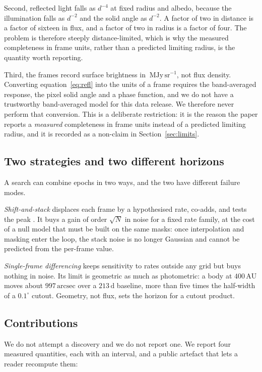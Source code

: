 \documentclass[11pt,a4paper]{article}
\newcommand{\unit}[1]{\,\mathrm{#1}}
\newcommand{\mjysr}{\ \mathrm{MJy\,sr^{-1}}}
\newcommand{\arcsec}{\unit{arcsec}}
\newcommand{\au}{\unit{AU}}
\begin{document}
Second, reflected light falls as $d^{-4}$ at fixed radius and albedo, because the
illumination falls as $d^{-2}$ and the solid angle as $d^{-2}$. A factor of two in
distance is a factor of sixteen in flux, and a factor of two in radius is a factor
of four. The problem is therefore steeply distance-limited, which is why the
measured completeness in frame units, rather than a predicted limiting radius, is
the quantity worth reporting.

Third, the frames record surface brightness in $\mjysr$, not flux density.
Converting equation~\eqref{eq:refl} into the units of a frame requires the
band-averaged response, the pixel solid angle and a phase function, and we do not
have a trustworthy band-averaged model for this data release. We therefore never
perform that conversion. This is a deliberate restriction: it is the reason the
paper reports a \emph{measured} completeness in frame units instead of a predicted
limiting radius, and it is recorded as a non-claim in Section~\ref{sec:limits}.

\subsection{Two strategies and two different horizons}
A search can combine epochs in two ways, and the two have different failure modes.

\emph{Shift-and-stack} displaces each frame by a hypothesised rate, co-adds, and
tests the peak \citep{rice2020}. It buys a gain of order $\sqrt{N}$ in noise for a
fixed rate family, at the cost of a null model that must be built on the same
masks: once interpolation and masking enter the loop, the stack noise is no longer
Gaussian and cannot be predicted from the per-frame value.

\emph{Single-frame differencing} keeps sensitivity to rates outside any grid but
buys nothing in noise. Its limit is geometric as much as photometric: a body at
$400\au$ moves about $997\arcsec$ over a $213\unit{d}$ baseline, more than five
times the half-width of a $0.1^{\circ}$ cutout. Geometry, not flux, sets the
horizon for a cutout product.

\subsection{Contributions}
We do not attempt a discovery and we do not report one. We report four measured
quantities, each with an interval, and a public artefact that lets a reader
recompute them:
\end{document}
